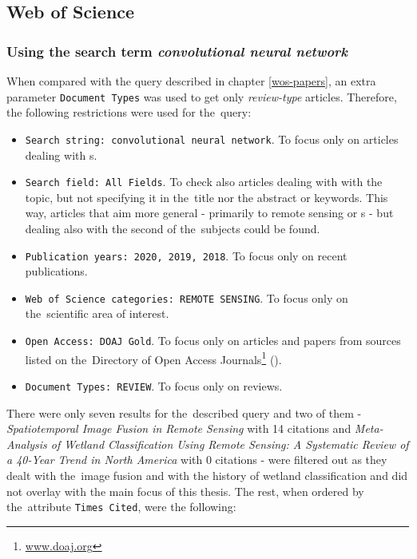 \subsection{Web of Science}
\label{wos-reviews}

\subsubsection{Using the search term \textit{convolutional neural network}}
\label{wos-reviews-full-length}

When compared with the query described in chapter \ref{wos-papers}, an extra parameter \verb|Document Types| was used to get only \textit{review-type} articles. Therefore, the following restrictions were used for the~query:

\begin{itemize}
	\item \verb|Search string: convolutional neural network|. To focus only on articles dealing with s.
	\item \verb|Search field: All Fields|. To check also articles dealing with with the topic, but not specifying it in the~title nor the abstract or keywords. This way, articles that aim more general - primarily to remote sensing or s - but dealing also with the second of the~subjects could be found.
	\item \verb|Publication years: 2020, 2019, 2018|. To focus only on recent publications.
	\item \verb|Web of Science categories: REMOTE SENSING|. To focus only on the~scien\-ti\-fic area of interest.
	\item \verb|Open Access: DOAJ Gold|. To focus only on articles and papers from sources listed on the~Di\-rectory of Open Access Journals\footnote{\url{www.doaj.org}} ().
	\item \verb|Document Types: REVIEW|. To focus only on reviews.
\end{itemize}

\noindent There were only seven results for the~described query and two of them - \textit{Spatiotemporal Image Fusion in Remote Sensing} \cite{review-st-fusion} with 14 citations and \textit{Meta-Analysis of Wetland Classification Using Remote Sensing: A Systematic Review of a 40-Year Trend in North America} \cite{review-wetlands-40-years} with 0 citations - were filtered out as they dealt with the~image fusion and with the history of wetland classification and did not overlay with the main focus of this thesis. The rest, when ordered by the~attribute \verb|Times Cited|, were the following:

